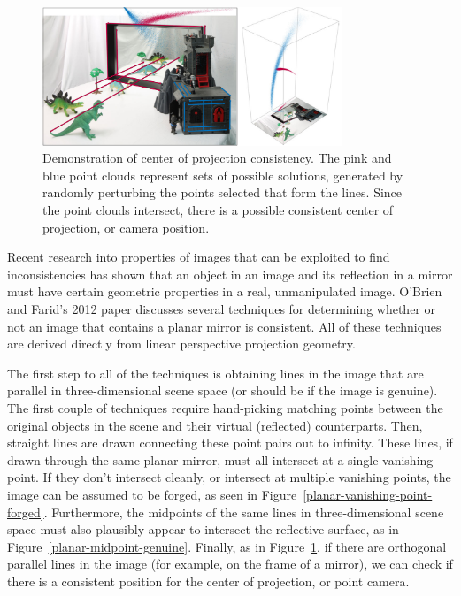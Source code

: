 \documentclass{thesis}
\begin{document}
\begin{figure}
	\centering
    	\includegraphics[width=0.8\textwidth]{center-of-projection-planar-genuine}
	\caption{Demonstration of center of projection consistency. The pink and blue point clouds represent sets of possible solutions, generated by randomly perturbing the points selected that form the lines. Since the point clouds intersect, there is a possible consistent center of projection, or camera position. \cite[Fig.~6]{obrien12}}
	\label{center-of-projection-planar-genuine}
\end{figure}

Recent research into properties of images that can be exploited to find inconsistencies has shown that an object in an image and its reflection in a mirror must have certain geometric properties in a real, unmanipulated image. O'Brien and Farid's 2012 paper discusses several techniques for determining whether or not an image that contains a planar mirror is consistent.\nocite{obrien12} All of these techniques are derived directly from linear perspective projection geometry.

The first step to all of the techniques is obtaining lines in the image that are parallel in three-dimensional scene space (or should be if the image is genuine). The first couple of techniques require hand-picking matching points between the original objects in the scene and their virtual (reflected) counterparts. Then, straight lines are drawn connecting these point pairs out to infinity. These lines, if drawn through the same planar mirror, must all intersect at a single vanishing point. If they don't intersect cleanly, or intersect at multiple vanishing points, the image can be assumed to be forged, as seen in Figure~\ref{planar-vanishing-point-forged}. Furthermore, the midpoints of the same lines in three-dimensional scene space must also plausibly appear to intersect the reflective surface, as in Figure~\ref{planar-midpoint-genuine}. Finally, as in Figure~\ref{center-of-projection-planar-genuine}, if there are orthogonal parallel lines in the image (for example, on the frame of a mirror), we can check if there is a consistent position for the center of projection, or point camera.
\end{document}
